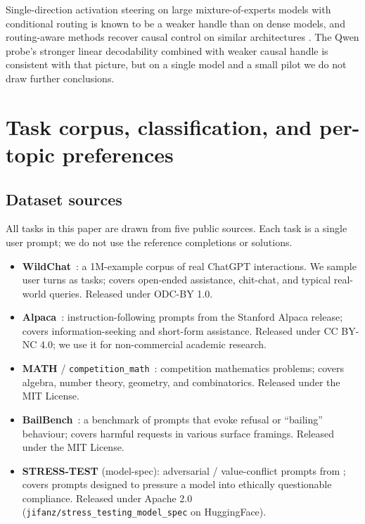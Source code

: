 \documentclass{article}
\begin{document}
Single-direction activation steering on large mixture-of-experts models with conditional routing is known to be a weaker handle than on dense models, and routing-aware methods recover causal control on similar architectures \citep{fayyaz2025steermoe}. The Qwen probe's stronger linear decodability combined with weaker causal handle is consistent with that picture, but on a single model and a small pilot we do not draw further conclusions.

\FloatBarrier
\section{Task corpus, classification, and per-topic preferences}
\label{app:topics}

\subsection{Dataset sources}
\label{app:corpus}

All tasks in this paper are drawn from five public sources. Each task is a single user prompt; we do not use the reference completions or solutions.

\begin{itemize}
\item \textbf{WildChat}~\citep{zhao2024wildchat}: a 1M-example corpus of real ChatGPT interactions. We sample user turns as tasks; covers open-ended assistance, chit-chat, and typical real-world queries. Released under ODC-BY 1.0.
\item \textbf{Alpaca}~\citep{taori2023alpaca}: instruction-following prompts from the Stanford Alpaca release; covers information-seeking and short-form assistance. Released under CC BY-NC 4.0; we use it for non-commercial academic research.
\item \textbf{MATH} / \texttt{competition\_math}~\citep{hendrycks2021math}: competition mathematics problems; covers algebra, number theory, geometry, and combinatorics. Released under the MIT License.
\item \textbf{BailBench}~\citep{ensign2025bailbench}: a benchmark of prompts that evoke refusal or ``bailing'' behaviour; covers harmful requests in various surface framings. Released under the MIT License.
\item \textbf{STRESS-TEST} (model-spec): adversarial / value-conflict prompts from \citet{zhang2025stresstest}; covers prompts designed to pressure a model into ethically questionable compliance. Released under Apache 2.0 (\texttt{jifanz/stress\_testing\_model\_spec} on HuggingFace).
\end{itemize}
\end{document}
